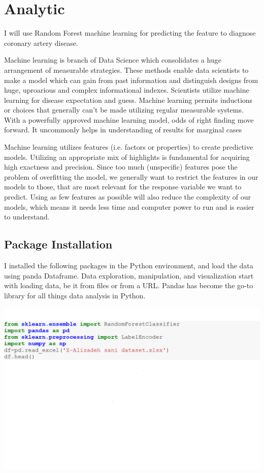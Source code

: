 \documentclass[sigconf]{acmart}
\begin{document}
\section{Analytic}
I will use Random Forest machine learning for predicting the feature to diagnose coronary artery disease.

Machine learning is branch of Data Science which consolidates a huge arrangement of measurable strategies. These methods enable data scientists to make a model which can gain from past information and distinguish designs from huge, uproarious and complex informational indexes. Scientists utilize machine learning for disease expectation and guess. Machine learning permits inductions or choices that generally can't be made utilizing regular measurable systems. With a powerfully approved machine learning model, odds of right finding move forward. It uncommonly helps in understanding of results for marginal cases

Machine learning utilizes features (i.e. factors or properties) to create predictive models. Utilizing an appropriate mix of highlights is fundamental for acquiring high exactness and precision. Since too much (unspecific) features pose the problem of overfitting the model, we generally want to restrict the features in our models to those, that are most relevant for the response variable we want to predict. Using as few features as possible will also reduce the complexity of our models, which means it needs less time and computer power to run and is easier to understand.

\subsection{Package Installation}

I installed the following packages in the Python environment, and load the data using panda Dataframe. Data exploration, manipulation, and visualization start with loading data, be it from files or from a URL. Pandas has become the go-to library for all things data analysis in Python.

\includegraphics[width=0.95\columnwidth]{project/images/Untitled1.png}
\end{document}
